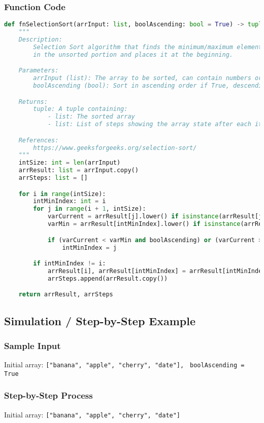 \documentclass{article}
\begin{document}
\subsubsection*{Function Code}
\begin{lstlisting}[language=Python]
def fnSelectionSort(arrInput: list, boolAscending: bool = True) -> tuple[list, list]:
    """
    Description:
        Selection Sort algorithm that finds the minimum/maximum element 
        in the unsorted portion and places it at the beginning.

    Parameters:
        arrInput (list): The array to be sorted, can contain numbers or strings
        boolAscending (bool): Sort in ascending order if True, descending if False

    Returns:
        tuple: A tuple containing:
            - list: The sorted array
            - list: List of steps showing the array state after each iteration

    References:
        https://www.geeksforgeeks.org/selection-sort/
    """
    intSize: int = len(arrInput)
    arrResult: list = arrInput.copy()
    arrSteps: list = []

    for i in range(intSize):
        intMinIndex: int = i
        for j in range(i + 1, intSize):
            varCurrent = arrResult[j].lower() if isinstance(arrResult[j], str) else arrResult[j]
            varMin = arrResult[intMinIndex].lower() if isinstance(arrResult[intMinIndex], str) else arrResult[intMinIndex]

            if (varCurrent < varMin and boolAscending) or (varCurrent > varMin and not boolAscending):
                intMinIndex = j

        if intMinIndex != i:
            arrResult[i], arrResult[intMinIndex] = arrResult[intMinIndex], arrResult[i]
            arrSteps.append(arrResult.copy())

    return arrResult, arrSteps
\end{lstlisting}

\subsection*{Simulation / Step-by-Step Example}
\subsubsection*{Sample Input}
Initial array: \texttt{["banana", "apple", "cherry", "date"], }
\texttt{boolAscending = True}
\subsubsection*{Step-by-Step Process}
Initial array: \texttt{["banana", "apple", "cherry", "date"]}
\end{document}

